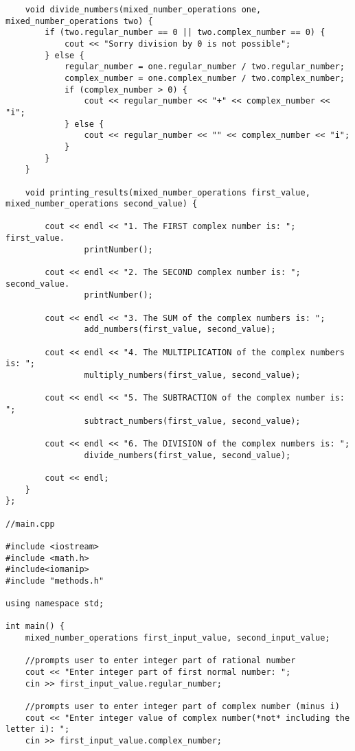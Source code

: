 \documentclass[11pt]{article}
\begin{document}
\begin{lstlisting}
    void divide_numbers(mixed_number_operations one, mixed_number_operations two) {
        if (two.regular_number == 0 || two.complex_number == 0) {
            cout << "Sorry division by 0 is not possible";
        } else {
            regular_number = one.regular_number / two.regular_number;
            complex_number = one.complex_number / two.complex_number;
            if (complex_number > 0) {
                cout << regular_number << "+" << complex_number << "i";
            } else {
                cout << regular_number << "" << complex_number << "i";
            }
        }
    }

    void printing_results(mixed_number_operations first_value, mixed_number_operations second_value) {

        cout << endl << "1. The FIRST complex number is: "; first_value.
                printNumber();

        cout << endl << "2. The SECOND complex number is: "; second_value.
                printNumber();

        cout << endl << "3. The SUM of the complex numbers is: ";
                add_numbers(first_value, second_value);

        cout << endl << "4. The MULTIPLICATION of the complex numbers is: ";
                multiply_numbers(first_value, second_value);

        cout << endl << "5. The SUBTRACTION of the complex number is: ";
                subtract_numbers(first_value, second_value);

        cout << endl << "6. The DIVISION of the complex numbers is: ";
                divide_numbers(first_value, second_value);

        cout << endl;
    }
};

//main.cpp

#include <iostream>
#include <math.h>
#include<iomanip>
#include "methods.h"

using namespace std;

int main() {
    mixed_number_operations first_input_value, second_input_value;

    //prompts user to enter integer part of rational number
    cout << "Enter integer part of first normal number: ";
    cin >> first_input_value.regular_number;

    //prompts user to enter integer part of complex number (minus i)
    cout << "Enter integer value of complex number(*not* including the letter i): ";
    cin >> first_input_value.complex_number;


\end{lstlisting}
\end{document}
